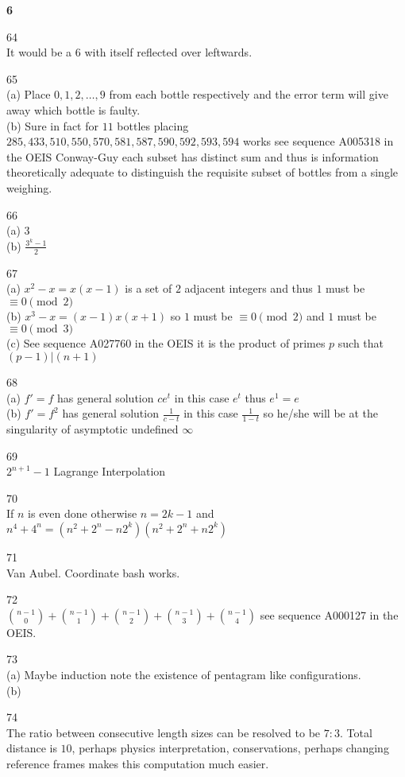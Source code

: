 \newpage

\textbf{6}

64 \\
It would be a $6$ with itself reflected over leftwards.

65 \\
(a) Place $0,1,2,\dots,9$ from each bottle respectively and the error term will give away which bottle is faulty. \\
(b) Sure in fact for $11$ bottles placing $285,433,510,550,570,581,587,590,592,593,594$ works see sequence A005318 in the OEIS Conway-Guy each subset has distinct sum and thus is information theoretically adequate to distinguish the requisite subset of bottles from a single weighing.

66 \\
(a) $\boxed{3}$ \\
(b) $\boxed{\frac{3^k-1}{2}}$

67 \\
(a) $x^2-x=x(x-1)$ is a set of $2$ adjacent integers and thus $1$ must be $\equiv 0 \pmod{2}$ \\
(b) $x^3-x=(x-1)x(x+1)$ so $1$ must be $\equiv 0 \pmod{2}$ and $1$ must be $\equiv 0 \pmod{3}$ \\
(c) See sequence A027760 in the OEIS it is the product of primes $p$ such that $(p-1)|(n+1)$

68 \\
(a) $f'=f$ has general solution $ce^t$ in this case $e^t$ thus $e^1=\boxed{e}$ \\
(b) $f'=f^2$ has general solution $\frac{1}{c-t}$ in this case $\frac{1}{1-t}$ so he/she will be at the singularity of asymptotic undefined $\infty$

69 \\
$\boxed{2^{n+1}-1}$ Lagrange Interpolation

70 \\
If $n$ is even done otherwise $n=2k-1$ and $n^4+4^n=(n^2+2^n-n2^k)(n^2+2^n+n2^k)$

71 \\
Van Aubel. Coordinate bash works.

72 \\
$\boxed{\binom{n-1}{0}+\binom{n-1}{1}+\binom{n-1}{2}+\binom{n-1}{3}+\binom{n-1}{4}}$ see sequence A000127 in the OEIS.

73 \\
(a) Maybe induction note the existence of pentagram like configurations. \\
(b) 

74 \\
The ratio between consecutive length sizes can be resolved to be $7:3$. Total distance is $10$, perhaps physics interpretation, conservations, perhaps changing reference frames makes this computation much easier.

